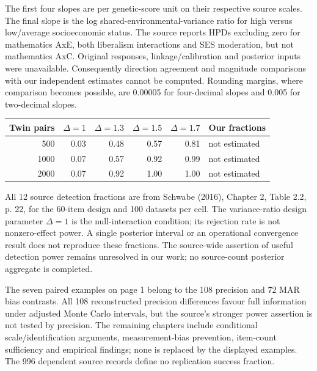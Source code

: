 \documentclass[11pt]{article}
\renewcommand{\arraystretch}{1.25}
\begin{document}
The first four slopes are per genetic-score unit on their respective source scales. The final slope is the log shared-environmental-variance ratio for high versus low/average socioeconomic status. The source reports HPDs excluding zero for mathematics AxE, both liberalism interactions and SES moderation, but not mathematics AxC. Original responses, linkage/calibration and posterior inputs were unavailable. Consequently direction agreement and magnitude comparisons with our independent estimates cannot be computed. Rounding margins, where comparison becomes possible, are 0.00005 for four-decimal slopes and 0.005 for two-decimal slopes.

{\small\setlength{\tabcolsep}{12pt}\renewcommand{\arraystretch}{1.3}
\begin{tabular}{@{}rrrrrl@{}}\toprule
Twin pairs & $\Delta=1$ & $\Delta=1.3$ & $\Delta=1.5$ & $\Delta=1.7$ & Our fractions\\\midrule
500 & 0.03 & 0.48 & 0.57 & 0.81 & not estimated\\
1000 & 0.07 & 0.57 & 0.92 & 0.99 & not estimated\\
2000 & 0.07 & 0.92 & 1.00 & 1.00 & not estimated\\\bottomrule
\end{tabular}}

All 12 source detection fractions are from Schwabe (2016), Chapter 2, Table 2.2, p. 22, for the 60-item design and 100 datasets per cell. The variance-ratio design parameter $\Delta=1$ is the null-interaction condition; its rejection rate is not nonzero-effect power. A single posterior interval or an operational convergence result does not reproduce these fractions. The source-wide assertion of useful detection power remains unresolved in our work; no source-count posterior aggregate is completed.

The seven paired examples on page 1 belong to the 108 precision and 72 MAR bias contrasts. All 108 reconstructed precision differences favour full information under adjusted Monte Carlo intervals, but the source's stronger power assertion is not tested by precision. The remaining chapters include conditional scale/identification arguments, measurement-bias prevention, item-count sufficiency and empirical findings; none is replaced by the displayed examples. The 996 dependent source records define no replication success fraction.
\newpage
\end{document}
